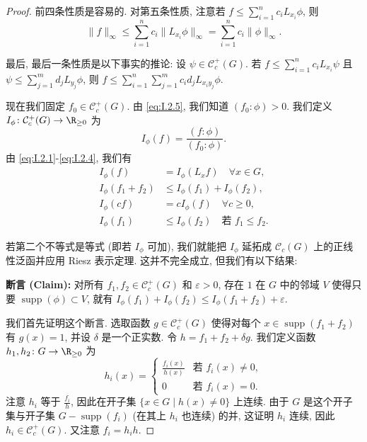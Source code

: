 \begin{proof}
前四条性质是容易的. 对第五条性质, 注意若 $f \leq \sum_{i=1}^n c_iL_{x_i}\phi$, 则
\[
\|f\|_{\infty} \leq \sum_{i=1}^n c_i\|L_{x_i}\phi\|_{\infty} = \sum_{i=1}^n c_i\|\phi\|_{\infty}.
\]

最后, 最后一条性质是以下事实的推论: 设 $\psi \in \mathcal{C}_c^+(G)$. 若 $f \leq \sum_{i=1}^n c_iL_{x_i}\psi$ 且 $\psi \leq \sum_{j=1}^m d_jL_{y_j}\phi$, 则 $f \leq \sum_{i=1}^n \sum_{j=1}^m c_id_jL_{x_iy_j}\phi$.

现在我们固定 $f_0 \in \mathcal{C}_c^+(G)$. 由 \eqref{eq:I.2.5}, 我们知道 $(f_0 : \phi) > 0$. 我们定义 $I_{\phi} \colon \mathcal{C}_c^+(G) \to \R_{\geq 0}$ 为
\[
I_{\phi}(f) = \frac{(f : \phi)}{(f_0 : \phi)}.
\]
由 \eqref{eq:I.2.1}-\eqref{eq:I.2.4}, 我们有
\begin{align*}
I_{\phi}(f) &= I_{\phi}(L_xf) \quad \forall x \in G, \\
I_{\phi}(f_1 + f_2) &\leq I_{\phi}(f_1) + I_{\phi}(f_2), \\
I_{\phi}(cf) &= cI_{\phi}(f) \quad \forall c \geq 0, \\
I_{\phi}(f_1) &\leq I_{\phi}(f_2) \quad \text{若 } f_1 \leq f_2.
\end{align*}

若第二个不等式是等式 (即若 $I_{\phi}$ 可加), 我们就能把 $I_{\phi}$ 延拓成 $\mathcal{C}_c(G)$ 上的正线性泛函并应用 Riesz 表示定理. 这并不完全成立, 但我们有以下结果:

\textbf{断言 (Claim):} 对所有 $f_1, f_2 \in \mathcal{C}_c^+(G)$ 和 $\varepsilon > 0$, 存在 $1$ 在 $G$ 中的邻域 $V$ 使得只要 $\operatorname{supp}(\phi) \subset V$, 就有 $I_{\phi}(f_1) + I_{\phi}(f_2) \leq I_{\phi}(f_1 + f_2) + \varepsilon$.

我们首先证明这个断言. 选取函数 $g \in \mathcal{C}_c^+(G)$ 使得对每个 $x \in \operatorname{supp}(f_1 + f_2)$ 有 $g(x) = 1$, 并设 $\delta$ 是一个正实数. 令 $h = f_1 + f_2 + \delta g$. 我们定义函数 $h_1, h_2 \colon G \to \R_{\geq 0}$ 为
\[
h_i(x) = \begin{cases} \frac{f_i(x)}{h(x)} & \text{若 } f_i(x) \neq 0, \\ 0 & \text{若 } f_i(x) = 0. \end{cases}
\]
注意 $h_i$ 等于 $\frac{f_i}{h}$, 因此在开子集 $\{x \in G \mid h(x) \neq 0\}$ 上连续. 由于 $G$ 是这个开子集与开子集 $G - \operatorname{supp}(f_i)$ (在其上 $h_i$ 也连续) 的并, 这证明 $h_i$ 连续, 因此 $h_i \in \mathcal{C}_c^+(G)$. 又注意 $f_i = h_ih$.


\end{proof}

